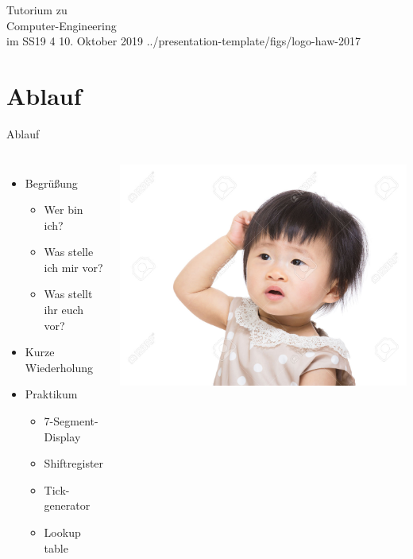 



   {Tutorium zu\\Computer-Engineering\\im SS19} {4} 
                 {10. Oktober 2019} {../presentation-template/figs/logo-haw-2017}

  \section{Ablauf}
  \begin{frame}{Ablauf}
    \begin{columns}
      \begin{itemize}
        \item Begrüßung
        \begin{itemize}
          \item Wer bin ich?
          \item Was stelle ich mir vor?
          \item Was stellt ihr euch vor?
        \end{itemize}
        \item Kurze Wiederholung
        \item Praktikum
        \begin{itemize}
          \item 7-Segment-Display
          \item Shiftregister
          \item Tick-generator
          \item Lookup table
        \end{itemize}
      \end{itemize}
        \begin{center}
          \includegraphics[width=.6\textwidth]{../presentation-template/figs/kratzen}
        \end{center}
    \end{columns}
  \end{frame}

